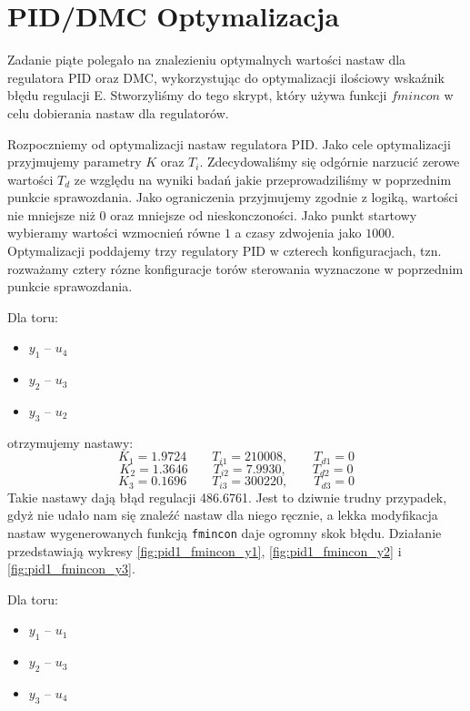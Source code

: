 \chapter{PID/DMC Optymalizacja}
Zadanie piąte polegało na znalezieniu optymalnych wartości nastaw dla regulatora PID oraz DMC, wykorzystując do optymalizacji ilościowy wskaźnik błędu regulacji E.
Stworzyliśmy do tego skrypt, który używa funkcji $fmincon$ w celu dobierania nastaw dla regulatorów.


Rozpoczniemy od optymalizacji nastaw regulatora PID. Jako cele optymalizacji przyjmujemy parametry $K$ oraz $T_i$. Zdecydowaliśmy się odgórnie narzucić zerowe wartości
$T_d$ ze względu na wyniki badań jakie przeprowadziliśmy w poprzednim punkcie sprawozdania.
Jako ograniczenia przyjmujemy zgodnie z logiką, wartości nie mniejsze niż 0 oraz mniejsze od nieskonczoności.
Jako punkt startowy wybieramy wartości wzmocnień równe $1$ a  czasy zdwojenia jako $1000$.
Optymalizacji poddajemy trzy regulatory PID w czterech konfiguracjach, tzn.
rozważamy cztery rózne konfiguracje torów sterowania wyznaczone w poprzednim punkcie sprawozdania.

Dla toru:
\begin{itemize}
  \item $y_1$ -- $u_4$
 \item $y_2$ -- $u_3$
 \item $y_3$ -- $u_2$
\end{itemize}

otrzymujemy nastawy:
\begin{equation}
  K_1 = \num{1.9724} \qquad T_{i1} = \num{210008}, \qquad T_{d1} = 0 \nonumber
\end{equation}
\begin{equation}
  K_2 = \num{1.3646} \qquad T_{i2} = \num{7.9930}, \qquad T_{d2} = 0
\end{equation}
\begin{equation}
  K_3 = \num{0.1696} \qquad T_{i3} = \num{300220}, \qquad T_{d3} = 0 \nonumber
\end{equation}
Takie nastawy dają błąd regulacji \num{486.6761}. Jest to dziwnie trudny przypadek,
gdyż nie udało nam się znaleźć nastaw dla niego ręcznie, a lekka modyfikacja nastaw
wygenerowanych funkcją \texttt{fmincon} daje ogromny skok błędu. Działanie
przedstawiają wykresy \ref{fig:pid1_fmincon_y1}, \ref{fig:pid1_fmincon_y2} i \ref{fig:pid1_fmincon_y3}.


Dla toru:
\begin{itemize}
  \item $y_1$ -- $u_1$
 \item $y_2$ -- $u_3$
 \item $y_3$ -- $u_4$
\end{itemize}

